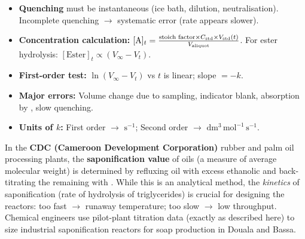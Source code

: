 \documentclass[11pt]{article}
\begin{document}
\begin{aretenir}
\begin{itemize}
    \item \textbf{Quenching} must be instantaneous (ice bath, dilution, neutralisation). Incomplete quenching $\rightarrow$ systematic error (rate appears slower).
    \item \textbf{Concentration calculation:} $[\ce{A}]_t = \frac{\text{stoich factor} \times C_{\text{std}} \times V_{\text{std}}(t)}{V_{\text{aliquot}}}$. For ester hydrolysis: $[\text{Ester}]_t \propto (V_\infty - V_t)$.
    \item \textbf{First-order test:} $\ln(V_\infty - V_t)$ vs $t$ is linear; slope $= -k$.
    \item \textbf{Major errors:} Volume change due to sampling, indicator blank,  absorption by , slow quenching.
    \item \textbf{Units of $k$:} First order $\rightarrow$ $\mathrm{s^{-1}}$; Second order $\rightarrow$ $\mathrm{dm^3\,mol^{-1}\,s^{-1}}$.
\end{itemize}
\end{aretenir}

\begin{savaistu}
In the \textbf{CDC (Cameroon Development Corporation)} rubber and palm oil processing plants, the \textbf{saponification value} of oils (a measure of average molecular weight) is determined by refluxing oil with excess ethanolic  and back-titrating the remaining  with . While this is an analytical method, the \emph{kinetics} of saponification (rate of hydrolysis of triglycerides) is crucial for designing the reactors: too fast $\rightarrow$ runaway temperature; too slow $\rightarrow$ low throughput. Chemical engineers use pilot-plant titration data (exactly as described here) to size industrial saponification reactors for soap production in Douala and Bassa.
\end{savaistu}
\end{document}
